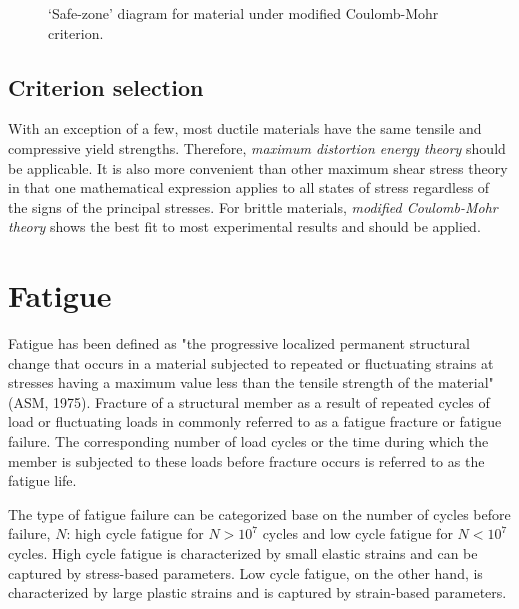 \documentclass[a4paper,openany,12pt]{book}
\begin{document}
\begin{figure}[h]
  \centering
  \caption{`Safe-zone' diagram for material under modified Coulomb-Mohr criterion.}
  \label{fig: MCM safe zone}
\end{figure}

\subsection{Criterion selection}
\label{sec:orgbb2e57c}
With an exception of a few, most ductile materials have the same tensile
and compressive yield strengths. Therefore, \emph{maximum distortion energy
theory} should be applicable. It is also more convenient than other
maximum shear stress theory in that one mathematical expression applies
to all states of stress regardless of the signs of the principal
stresses. For brittle materials, \emph{modified Coulomb-Mohr theory} shows
the best fit to most experimental results and should be applied.

\section{Fatigue}
\label{sec:org2c0d76e}
Fatigue has been defined as "the progressive localized permanent
structural change that occurs in a material subjected to repeated or
fluctuating strains at stresses having a maximum value less than the
tensile strength of the material" (ASM, 1975). Fracture of a structural
member as a result of repeated cycles of load or fluctuating loads in
commonly referred to as a fatigue fracture or fatigue failure. The
corresponding number of load cycles or the time during which the member
is subjected to these loads before fracture occurs is referred to as the
fatigue life.

The type of fatigue failure can be categorized base on the number of
cycles before failure, \(N\): high cycle fatigue for \(N > 10^7\) cycles and
low cycle fatigue for \(N < 10^7\) cycles. High cycle fatigue is
characterized by small elastic strains and can be captured by
stress-based parameters. Low cycle fatigue, on the other hand, is
characterized by large plastic strains and is captured by strain-based
parameters.
\end{document}
